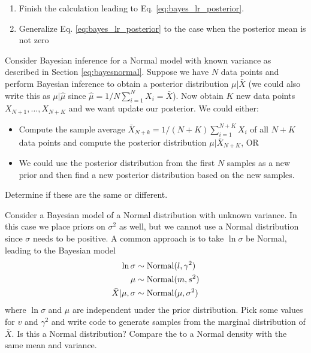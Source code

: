 \begin{exercise}

\begin{enumerate}[label=(\alph*)]
\item Finish the calculation leading to Eq. \ref{eq:bayes_lr_posterior}. 
\item Generalize Eq. \ref{eq:bayes_lr_posterior} to the case when the posterior mean is not zero \end{enumerate}
\end{exercise}


\begin{exercise}
Consider Bayesian inference for a Normal model with known variance as described in Section \ref{eq:bayesnormal}. 
Suppose we have $N$ data points and perform Bayesian inference to obtain a posterior distribution $\mu|\bar{X}$ (we could also write this as $\mu|\hat{\mu}$ since $\hat{\mu}  = 1/N\sum_{i=1}^NX_i= \bar{X}$). Now obtain $K$ new data points $X_{N+1},\dots,X_{N+K}$ and we want update our posterior. We could either: 
\begin{itemize}
\item Compute the sample average $\bar{X}_{N+k} =1/(N+K) \sum_{i=1}^{N+K}X_i$ of all $N+K$ data points and compute the posterior distribution $\mu|\bar{X}_{N+K}$, OR
\item We could use the posterior distribution from the first $N$ samples as a new prior and then find a new posterior distribution based on the new samples. 
\end{itemize}
Determine if these are the same or different. 

\end{exercise}


\begin{exercise}
Consider a Bayesian model of a Normal distribution with unknown variance. In this case we place priors on $\sigma^2$ as well, but we cannot use a Normal distribution since $\sigma$ needs to be positive. A common approach is to take $\ln \sigma$ be Normal,  leading to the Bayesian model 
\begin{align}
\ln \sigma &\sim {\rm Normal}(l,\gamma^2)\\
\mu &\sim {\rm Normal}(m,s^2)\\
\bar{X}|\mu,\sigma &\sim {\rm Normal}(\mu,\sigma^2)
\end{align}
where $\ln \sigma$ and $\mu$ are independent under the prior distribution.
Pick some values for $v$ and $\gamma^2$ and write code to generate samples from the marginal distribution of $\bar{X}$. Is this a Normal distribution? Compare the to a Normal density with the same mean and variance.  
\end{exercise}









